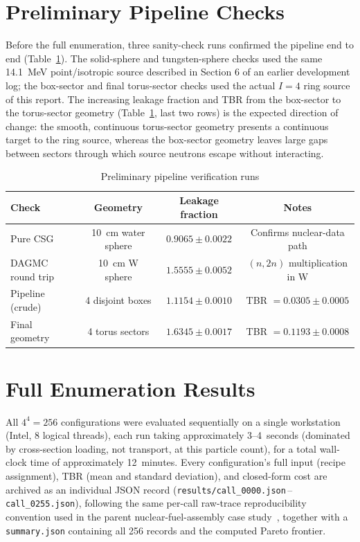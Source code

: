 \documentclass[11pt]{article}
\begin{document}
\section{Preliminary Pipeline Checks}
\label{sec:results-prelim}

Before the full enumeration, three sanity-check runs confirmed the
pipeline end to end (Table~\ref{t:prelim}). The solid-sphere and
tungsten-sphere checks used the same 14.1~MeV point/isotropic source
described in Section 6 of an earlier development log; the box-sector and
final torus-sector checks used the actual $I=4$ ring source of this report.
The increasing leakage fraction and TBR from the box-sector to the
torus-sector geometry (Table~\ref{t:prelim}, last two rows) is the expected
direction of change: the smooth, continuous torus-sector geometry presents
a continuous target to the ring source, whereas the box-sector geometry
leaves large gaps between sectors through which source neutrons escape
without interacting.

\begin{table}[h]
\centering
\caption{Preliminary pipeline verification runs}\label{t:prelim}
\begin{tabular}{lccc}
\toprule
Check & Geometry & Leakage fraction & Notes \\
\midrule
Pure CSG & 10~cm water sphere & $0.9065\pm0.0022$ & Confirms nuclear-data path \\
DAGMC round trip & 10~cm W sphere & $1.5555\pm0.0052$ & $(n,2n)$ multiplication in W \\
Pipeline (crude) & 4 disjoint boxes & $1.1154\pm0.0010$ & TBR $=0.0305\pm0.0005$ \\
Final geometry & 4 torus sectors & $1.6345\pm0.0017$ & TBR $=0.1193\pm0.0008$ \\
\bottomrule
\end{tabular}
\end{table}

\section{Full Enumeration Results}

All $4^4=256$ configurations were evaluated sequentially on a single
workstation (Intel, 8 logical threads), each run taking approximately
3--4~seconds (dominated by cross-section loading, not transport, at this
particle count), for a total wall-clock time of approximately 12~minutes.
Every configuration's full input (recipe assignment), TBR (mean and
standard deviation), and closed-form cost are archived as an individual
JSON record (\texttt{results/call\_0000.json}\,--\,\texttt{call\_0255.json}),
following the same per-call raw-trace reproducibility convention used in
the parent nuclear-fuel-assembly case study~\cite{chang2026}, together
with a \texttt{summary.json} containing all 256 records and the computed
Pareto frontier.
\end{document}
